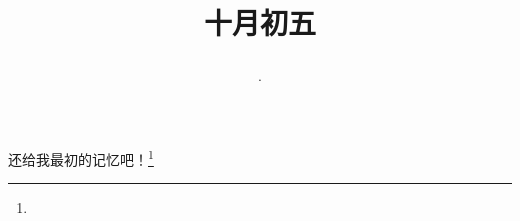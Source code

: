 \title{\date[d=5,m=11,y=2024][year:cn-y,年,month:cn,day:cn,日,·,weekday]·十月初五 }
还给我最初的记忆吧！\footnote{ }

